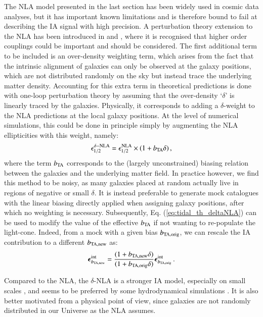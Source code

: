 \documentclass[useAMS,usenatbib]{mn2e}
\begin{document}
The NLA model presented in the last section has been widely used in cosmic data analyses, but it has important known limitations and is therefore bound to fail at describing the IA signal with high precision.
A perturbation theory extension to the NLA has been introduced in \citet{Blazek2015} and  \citet{Blazek2019},  where it is recognised that higher order couplings could be important and should be considered. The first additional term to be included is an over-density weighting term, which arises from the fact that  the intrinsic alignment of galaxies can only be observed at the galaxy positions, which are not distributed randomly on the sky but instead trace the underlying matter density.  Accounting for this extra term in theoretical predictions is done with one-loop perturbation theory  \citep{Blazek2019} by assuming that the over-density  `$\delta$' is linearly traced by the galaxies. Physically, it corresponds to adding a $\delta$-weight to the NLA predictions at the local galaxy positions. At the level of numerical simulations, this could be done in principle simply by augmenting the NLA ellipticities with this weight, namely:
 \begin{eqnarray}
\epsilon_{1/2}^{\delta-\rm NLA} = \epsilon_{1/2}^{\rm NLA}\times(1 + b_{\rm TA}\delta) \, ,
\label{eq:tidal_th_deltaNLA}
\end{eqnarray}
where the term $b_{\rm TA}$ corresponds to the (largely unconstrained) biasing relation between the galaxies and the underlying matter field. In practice however, we find this method to be noisy, as many galaxies placed at random actually live in regions of negative or small $\delta$. It is instead preferable to generate mock catalogues with the linear biasing directly applied when assigning galaxy positions, after which no weighting is necessary. Subsequently, Eq. (\ref{eq:tidal_th_deltaNLA}) can be used to modify the value of the effective $b_{\rm TA}$ if not wanting to re-populate the light-cone. Indeed, from a mock with a given bias $b_{\rm TA, orig}$, we can rescale the IA contribution to a different $b_{\rm TA, new}$  as:
\begin{eqnarray}
{\boldsymbol \epsilon}^{\rm int}_{b_{\rm TA, new}}  = \frac{(1 + b_{\rm TA, new}\delta)}{(1 + b_{\rm TA, orig}\delta)}{\boldsymbol \epsilon}^{\rm int}_{b_{\rm TA, orig}} \, .
\label{eq:bta_rescale}
\end{eqnarray}


Compared to the NLA, the $\delta$-NLA is a stronger IA model, especially on small scales \citep{Blazek2019}, and seems to be preferred by some hydrodynamical simulations \citep{Hilbert_IA2017}. It is also better motivated from a physical point of view, since galaxies are not randomly distributed in our Universe as the NLA assumes.
\end{document}
